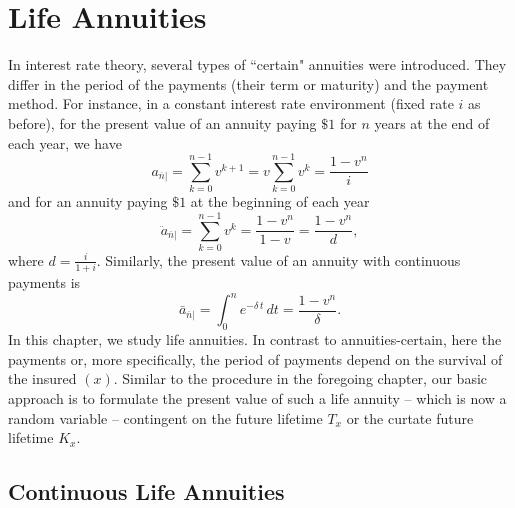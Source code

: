 \documentclass[11pt,fleqn,oneside]{book}
\begin{document}
\chapter{Life Annuities}
\label{CHAPANN}

In interest rate theory, several types of  ``certain" annuities were introduced. They differ in the period of the payments (their term or maturity) and the payment method. For instance, in a constant interest rate environment (fixed rate $i$ as before), for the present value of an annuity paying $\$1$ for $n$ years at the end of each year, we have
$$
a_{\overline{n}|} = \sum_{k=0}^{n-1} v^{k+1} = v \sum_{k=0}^{n-1} v^k = \frac{1-v^n}{i}
$$ 
and for an annuity paying  $\$ 1$ at the beginning of each year
$$
\ddot{a}_{\overline{n}|} = \sum_{k=0}^{n-1} v^{k} = \frac{1-v^n}{1-v} = \frac{1-v^n}{d},
$$
where $d=\frac{i}{1+i}$. Similarly, the present value of an annuity with continuous payments is 
$$
\bar{a}_{\overline{n}|} = \int_{0}^{n} e^{-\delta\,t}\,dt = \frac{1-v^n}{\delta}.
$$
In this chapter, we study life annuities. In contrast to annuities-certain, here the payments or, more specifically, the period of payments depend on the survival of the insured $(x)$. Similar to the procedure in the foregoing chapter, our basic approach is to formulate the present value of such a life annuity -- which is now a random variable -- contingent on the future lifetime $T_x$ or the curtate future lifetime $K_x$.

\section{Continuous Life Annuities}
\label{SECCONTANN}
\end{document}
